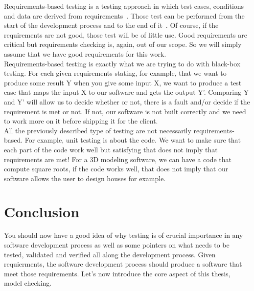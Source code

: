 \documentclass[12pt]{article}
\theoremstyle{definition}
\theoremstyle{definition}
\theoremstyle{remark}
\begin{document}

Requirements-based testing is a testing approach in which test cases, conditions and data are derived from requirements~\cite{IBMRequirementBasedTesting:2017}. Those test can be performed from the start of the development process and to the end of it~\cite{BenderRBTRequirementBasedTesting:2017}. Of course, if the requirements are not good, those test will be of little use. Good requirements are critical but requirements checking is, again, out of our scope. So we will simply assume that we have good requirements for this work.\\

Requirements-based testing is exactly what we are trying to do with black-box testing. For each given requirements stating, for example, that we want to produce some result Y when you give some input X, we want to produce a test case that maps the input X to our software and gets the output Y'. Comparing Y and Y' will allow us to decide whether or not, there is a fault and/or decide if the requirement is met or not. If not, our software is not built correctly and we need to work more on it before shipping it for the client.\\

All the previously described type of testing are not necessarily requirements-based. For example, unit testing is about the code. We want to make sure that each part of the code work well but satisfying that does not imply that requirements are met! For a 3D modeling software, we can have a code that compute square roots, if the code works well, that does not imply that our software allows the user to design houses for example.\\



\section{Conclusion}


You should now have a good idea of why testing is of crucial importance in any software development process as well as some pointers on what needs to be tested, validated and verified all along the development process. Given requierments, the software development process should produce a software that meet those requirements. Let's now introduce the core aspect of this thesis, model checking.
\end{document}
